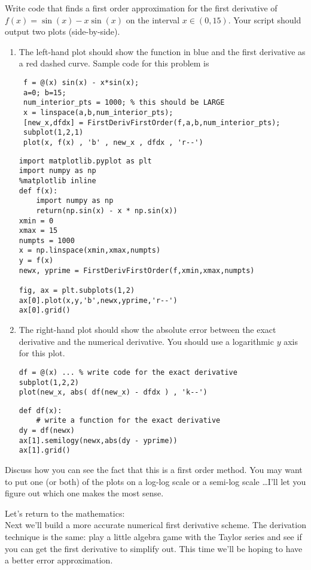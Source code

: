 \begin{problem}
    Write code that finds a first order approximation for the first derivative
    of $f(x) = \sin(x) - x\sin(x)$ on the interval $x \in (0,15)$.  Your script should
    output two plots (side-by-side). 
    \begin{enumerate}
        \item The left-hand plot should show the function in blue and the first derivative
            as a red dashed curve. Sample code for this problem is
           \ifnum{}
\begin{lstlisting}
 f = @(x) sin(x) - x*sin(x);
 a=0; b=15;
 num_interior_pts = 1000; % this should be LARGE
 x = linspace(a,b,num_interior_pts);
 [new_x,dfdx] = FirstDerivFirstOrder(f,a,b,num_interior_pts);
 subplot(1,2,1)
 plot(x, f(x) , 'b' , new_x , dfdx , 'r--')
\end{lstlisting}
\else
\begin{lstlisting}
import matplotlib.pyplot as plt
import numpy as np
%matplotlib inline
def f(x):
    import numpy as np
    return(np.sin(x) - x * np.sin(x))
xmin = 0
xmax = 15
numpts = 1000
x = np.linspace(xmin,xmax,numpts)
y = f(x)
newx, yprime = FirstDerivFirstOrder(f,xmin,xmax,numpts)

fig, ax = plt.subplots(1,2)
ax[0].plot(x,y,'b',newx,yprime,'r--')
ax[0].grid()
\end{lstlisting}
\fi
        \item The right-hand plot should show the absolute error between the exact
            derivative and the numerical derivative.  You should use a logarithmic $y$
            axis for this plot.
            \ifnum{}
\begin{lstlisting}
df = @(x) ... % write code for the exact derivative
subplot(1,2,2)
plot(new_x, abs( df(new_x) - dfdx ) , 'k--')
\end{lstlisting}
\else
\begin{lstlisting}
def df(x):
    # write a function for the exact derivative
dy = df(newx)
ax[1].semilogy(newx,abs(dy - yprime))
ax[1].grid()
\end{lstlisting}
\fi
    \end{enumerate}
    Discuss how you can see the fact that this is a first order method.  You may want to
    put one (or both) of the plots on a log-log scale or a semi-log scale \ldots I'll let
    you figure out which one makes the most sense.
\end{problem}


Let's return to the mathematics: \\
Next we'll build a more accurate numerical first derivative scheme.  The derivation
technique is the same: play a little algebra game with the Taylor series and see if you
can get the first derivative to simplify out.  This time we'll be hoping to have a better
error approximation.

